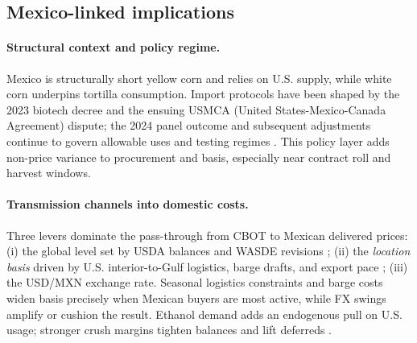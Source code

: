 \documentclass[11pt,a4paper]{article} %
\begin{document}
\subsection{Mexico-linked implications}

\paragraph{Structural context and policy regime.}
Mexico is structurally short yellow corn and relies on U.S. supply, while white corn underpins tortilla consumption. Import protocols have been shaped by the 2023 biotech decree and the ensuing USMCA (United States-Mexico-Canada Agreement) dispute; the 2024 panel outcome and subsequent adjustments continue to govern allowable uses and testing regimes \citep{fas_mexico_decree_2023,ustr_usmca_biotech_2023,ustr_usmca_biotech_win_2024,reuters_mexico_gm_ban_2025,fas_mexico_grain_annual_2025}. This policy layer adds non-price variance to procurement and basis, especially near contract roll and harvest windows.

\paragraph{Transmission channels into domestic costs.}
Three levers dominate the pass-through from CBOT to Mexican delivered prices:
(i) the global level set by USDA balances and WASDE revisions \citep{usda_wasde,ers_feedgrains_outlook};
(ii) the \emph{location basis} driven by U.S. interior-to-Gulf logistics, barge drafts, and export pace \citep{ams_gtr_2023};
(iii) the USD/MXN exchange rate. Seasonal logistics constraints and barge costs widen basis precisely when Mexican buyers are most active, while FX swings amplify or cushion the result. Ethanol demand adds an endogenous pull on U.S. usage; stronger crush margins tighten balances and lift deferreds \citep{ers_ethanol_40}.
\end{document}
